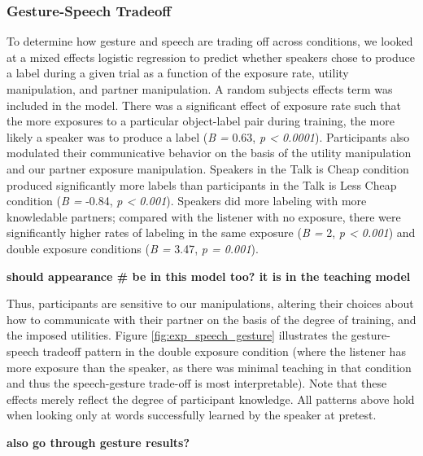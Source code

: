 \documentclass[10pt, letterpaper]{article}
\begin{document}
\subsubsection{Gesture-Speech Tradeoff}\label{gesture-speech-tradeoff}

To determine how gesture and speech are trading off across conditions,
we looked at a mixed effects logistic regression to predict whether
speakers chose to produce a label during a given trial as a function of
the exposure rate, utility manipulation, and partner manipulation. A
random subjects effects term was included in the model. There was a
significant effect of exposure rate such that the more exposures to a
particular object-label pair during training, the more likely a speaker
was to produce a label (\emph{B =} 0.63, \emph{p \textless{} 0.0001}).
Participants also modulated their communicative behavior on the basis of
the utility manipulation and our partner exposure manipulation. Speakers
in the Talk is Cheap condition produced significantly more labels than
participants in the Talk is Less Cheap condition (\emph{B =} -0.84,
\emph{p \textless{} 0.001}). Speakers did more labeling with more
knowledable partners; compared with the listener with no exposure, there
were significantly higher rates of labeling in the same exposure
(\emph{B =} 2, \emph{p \textless{} 0.001}) and double exposure
conditions (\emph{B =} 3.47, \emph{p = 0.001}).

\textbf{should appearance \# be in this model too? it is in the teaching
model}

Thus, participants are sensitive to our manipulations, altering their
choices about how to communicate with their partner on the basis of the
degree of training, and the imposed utilities. Figure
\ref{fig:exp_speech_gesture} illustrates the gesture-speech tradeoff
pattern in the double exposure condition (where the listener has more
exposure than the speaker, as there was minimal teaching in that
condition and thus the speech-gesture trade-off is most interpretable).
Note that these effects merely reflect the degree of participant
knowledge. All patterns above hold when looking only at words
successfully learned by the speaker at pretest.

\textbf{also go through gesture results?}
\end{document}
